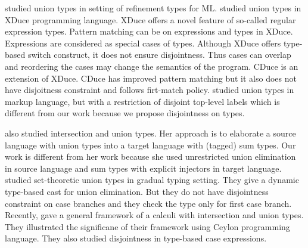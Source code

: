 \citet{freeman1991refinement} studied union types in setting of
refinement types for ML.  \citet{hosoya2003xduce} studied union types
in XDuce programming language. XDuce offers a novel feature of
so-called regular expression types. Pattern matching can be on
expressions and types in XDuce.  Expressions are considered as special
cases of types. Although XDuce offers type-based switch construct,
it does not ensure disjointness. Thus cases can overlap and
reordering the cases may change the semantics of the program. CDuce
\cite{benzaken2003cduce} is an extension of XDuce. CDuce has improved
pattern matching but it also does not have disjoitness constraint and
follows firt-match policy.  \citet{fallside2001xml} studied union
types in markup language, but with a restriction of disjoint top-level
labels which is different from our work because we propose
disjointness on types.

\citet{dunfield2014elaborating} also studied intersection and union
types. Her approach is to elaborate a source language with union types into a
target language with (tagged) sum types. Our
work is different from her work because she used unrestricted union
elimination
in source language and sum types with explicit injectors
in target language.  \citet{castagna2017gradual} studied
set-theoretic union types in gradual typing setting. They
give a dynamic type-based cast for union elimination. But they do not
have disjointness constraint on case branches and they check the type
only for first case branch.
Recently, \citet{muehlboeck2018empowering} gave a general framework of a calculi
with intersection and union types. They illustrated the significane of
their framework using Ceylon programming language.  They also studied
disjointness in type-based case expressions.

